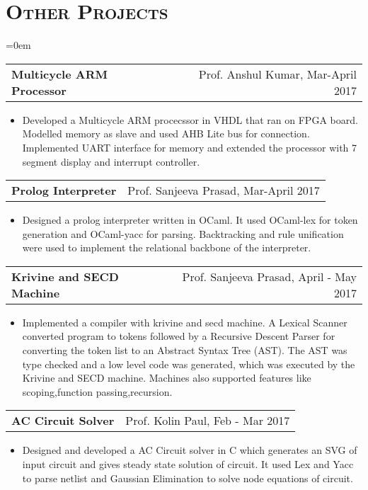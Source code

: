 \documentclass{article}
\makeatletter
\newenvironment{longversion}{}{} %
\newcommand{\headerrow}[2]
{\begin{tabular*}{\linewidth}{l@{\extracolsep{\fill}}r}
	#1 &
	#2 \\
\end{tabular*}}
\newcommand{\tmpsection}[1]{}
\let\tmpsection=\section
\renewcommand{\section}[1]{\tmpsection*{\textsc{#1}}}
\makeatother
\begin{document}
\begin{longversion}
\section{Other Projects}
\begin{list} {}{\leftmargin=0em}
\setlength{\leftmargin}{0pt}

\item[]
\headerrow {\textbf{Multicycle ARM Processor}}{Prof. Anshul Kumar, Mar-April 2017}
\begin{itemize} \item[]
Developed a Multicycle ARM procecssor in VHDL that ran on FPGA board. Modelled memory as slave and used AHB Lite bus for connection. Implemented UART interface for memory and extended the processor with 7 segment display and interrupt controller.
\end{itemize}

\item[]
\headerrow {\textbf{Prolog Interpreter}}{Prof. Sanjeeva Prasad, Mar-April 2017}
\begin{itemize} \item[] 
Designed a prolog interpreter written in OCaml. It used OCaml-lex for token generation and OCaml-yacc for parsing. Backtracking and rule unification were used to implement the relational backbone of the interpreter.
\end{itemize}

\item[]
\headerrow{ \textbf{Krivine and SECD Machine}} {Prof. Sanjeeva Prasad, April - May 2017}
\begin{itemize} \item[] 
Implemented a compiler with krivine and secd machine. A Lexical Scanner converted program to tokens followed by a Recursive Descent Parser for converting the token list to an Abstract Syntax Tree (AST). The AST was type checked and a low level code was generated, which was executed by the Krivine and SECD machine. Machines also supported features like scoping,function passing,recursion.
\end{itemize}

\item[]
\headerrow { \textbf{AC Circuit Solver}} {Prof. Kolin Paul, Feb - Mar 2017}
\begin{itemize} \item[]
Designed and developed a AC Circuit solver in C which generates an SVG of input circuit and gives steady state solution of circuit. It used Lex and Yacc to parse netlist and Gaussian Elimination to solve node equations of circuit. 
\end{itemize}


\end{list}
\end{longversion}
\end{document}

